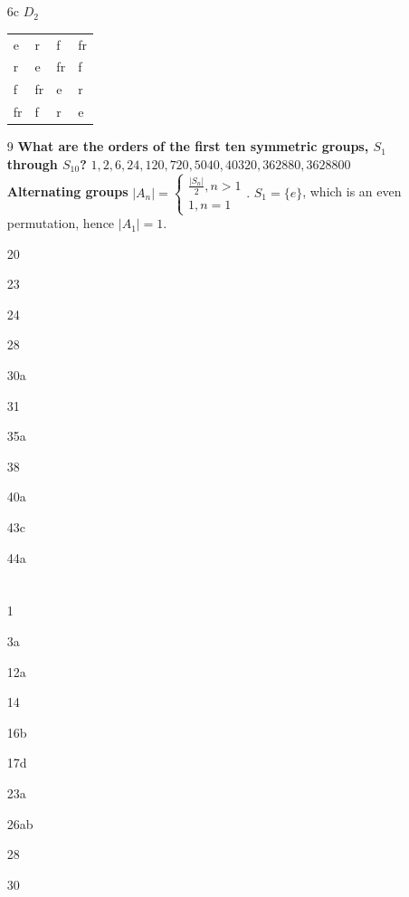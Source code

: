 \documentclass[12pt]{article}
\begin{document}
\section{}
\begin{enumerate}
\item[6c] $D_2$\\
   \begin{center}
    \begin{tabular}{llll}
      e & r & f & fr\\
      r & e & fr & f\\
      f & fr & e & r\\
      fr & f & r & e\\
    \end{tabular}
  \end{center}
\item[9] {\bf What are the orders of the first ten symmetric groups, $S_1$ through $S_{10}$?}
  $1, 2, 6, 24, 120, 720, 5040, 40320, 362880, 3628800$\\
  {\bf Alternating groups}
  $|A_n| =
  \begin{cases}
    \frac{|S_n|}{2}, n > 1\\
    1, n = 1
  \end{cases}.$
  $S_1 = \{e\}$, which is an even permutation, hence $|A_1| = 1$.

\item[20]
\item[23]
\item[24]
\item[28]
\item[30a]
\item[31]
\item[35a]
\item[38]
\item[40a]
\item[43c]
\item[44a]
\end{enumerate}


\section{}
\begin{enumerate}
\item[1]
\item[3a]
\item[12a]
\item[14]
\item[16b]
\item[17d]
\item[23a]
\item[26ab]
\item[28]
\item[30]
\end{enumerate}
\end{document}
